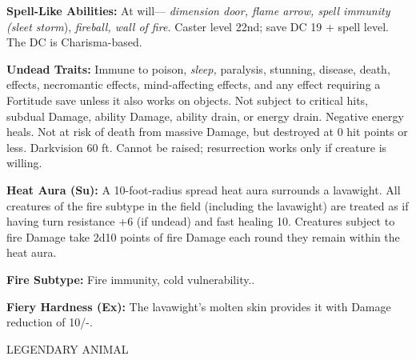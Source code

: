 \documentclass{article}
\begin{document}
{\textbf{Spell-Like Abilities: }At will--- \textit{dimension door, flame arrow, 
spell immunity (sleet storm}), \textit{fireball, wall of fire. }Caster level 22nd; 
save DC 19 + spell level. The DC is Charisma-based.

\textbf{Undead Traits:} Immune to poison, \textit{sleep, }paralysis, stunning, 
disease, death, effects, necromantic effects, mind-affecting effects, and any effect 
requiring a Fortitude save unless it also works on objects. Not subject to critical 
hits, subdual Damage, ability Damage, ability drain, or energy drain. Negative 
energy heals. Not at risk of death from massive Damage, but destroyed at 0 hit 
points or less. Darkvision 60 ft. Cannot be raised; resurrection works only if 
creature is willing. 

\textbf{Heat Aura (Su):} A 10-foot-radius spread heat aura surrounds a lavawight. 
All creatures of the fire subtype in the field (including the lavawight) are treated 
as if having turn resistance +6 (if undead) and fast healing 10. Creatures subject 
to fire Damage take 2d10 points of fire Damage each round they remain within the 
heat aura. 

\textbf{Fire Subtype:} Fire immunity, cold vulnerability.. 

\textbf{Fiery Hardness (Ex):} The lavawight's molten skin provides it with Damage 
reduction of 10/-. 

\vspace{12pt}
{\LARGE{}LEGENDARY ANIMAL}

}
\end{document}
